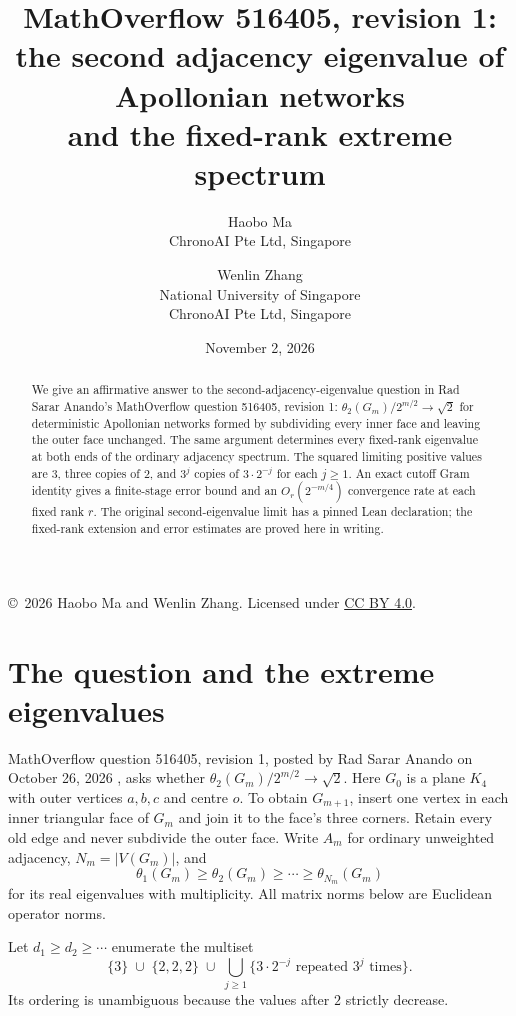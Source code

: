 \documentclass[11pt]{article}
\title{MathOverflow 516405, revision 1:\\
the second adjacency eigenvalue of Apollonian networks\\
and the fixed-rank extreme spectrum}
\author{Haobo Ma\\\small ChronoAI Pte Ltd, Singapore
\and Wenlin Zhang\\\small National University of Singapore\\\small ChronoAI Pte Ltd, Singapore}
\date{November 2, 2026}
\begin{document}
\maketitle
\begin{abstract}
We give an affirmative answer to the second-adjacency-eigenvalue question in
Rad Sarar Anando's MathOverflow question 516405, revision 1:
$\theta_2(G_m)/2^{m/2}\to\sqrt2$ for deterministic Apollonian networks
formed by subdividing every inner face and leaving the outer face unchanged.
The same argument determines every fixed-rank eigenvalue at both ends of the
ordinary adjacency spectrum. The squared limiting positive values are $3$,
three copies of $2$, and $3^j$ copies of $3\cdot2^{-j}$ for each $j\ge1$.
An exact cutoff Gram identity gives a finite-stage error bound and an
$O_r(2^{-m/4})$ convergence rate at each fixed rank $r$.
The original second-eigenvalue limit has a pinned Lean declaration; the
fixed-rank extension and error estimates are proved here in writing.
\end{abstract}
\begin{center}\small
\copyright\ 2026 Haobo Ma and Wenlin Zhang.
Licensed under \href{https://creativecommons.org/licenses/by/4.0/}{CC BY 4.0}.
\end{center}

\section{The question and the extreme eigenvalues}
MathOverflow question 516405, revision 1, posted by Rad Sarar Anando on
October 26, 2026 \cite{anando}, asks whether
$\theta_2(G_m)/2^{m/2}\to\sqrt2$. Here $G_0$ is a plane $K_4$ with outer
vertices $a,b,c$ and centre $o$. To obtain $G_{m+1}$, insert one vertex
in each inner triangular face of $G_m$ and join it to the face's three
corners. Retain every old edge and never subdivide the outer face.
Write $A_m$ for ordinary unweighted adjacency, $N_m=|V(G_m)|$, and
\[
\theta_1(G_m)\ge\theta_2(G_m)\ge\cdots\ge\theta_{N_m}(G_m)
\]
for its real eigenvalues with multiplicity. All matrix norms below are
Euclidean operator norms.

Let $d_1\ge d_2\ge\cdots$ enumerate the multiset
\begin{equation}\label{eq:weights}
\{3\}\;\cup\;\{2,2,2\}\;\cup\;
\bigcup_{j\ge1}\{3\cdot2^{-j}\text{ repeated }3^j\text{ times}\}.
\end{equation}
Its ordering is unambiguous because the values after $2$ strictly decrease.
\end{document}
